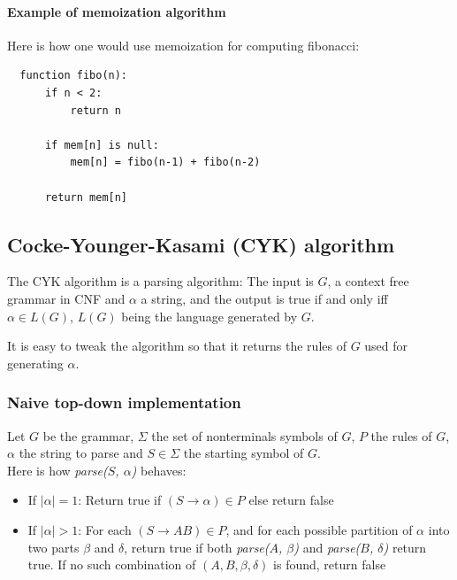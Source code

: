 \documentclass[twocolumn]{article}
\begin{document}
\paragraph{Example of memoization algorithm} Here is how one would use memoization for computing fibonacci:\\
\begin{lstlisting}
  function fibo(n):
      if n < 2:
          return n

      if mem[n] is null:
          mem[n] = fibo(n-1) + fibo(n-2)
          
      return mem[n]
\end{lstlisting}

\subsection{Cocke-Younger-Kasami (CYK) algorithm}
The CYK algorithm is a parsing algorithm: The input is $G$, a context free grammar in CNF and $\alpha$ a string, and the output is true if and only iff $\alpha\in L(G)$, $L(G)$ being the language generated by $G$.\par
It is easy to tweak the algorithm so that it returns the rules of $G$ used for generating $\alpha$.

\subsubsection{Naive top-down implementation}
Let $G$ be the grammar, $\Sigma$ the set of nonterminals symbols of $G$, $P$ the rules of $G$, $\alpha$ the string to parse and $S\in \Sigma$ the starting symbol of $G$.\\
Here is how \textit{parse($S$, $\alpha$)} behaves:
\begin{itemize}
\item If $|\alpha|=1$: Return true if $(S\rightarrow\alpha)\in P$ else return false
\item If $|\alpha|>1$: For each $(S\rightarrow AB)\in P$, and for each possible partition of $\alpha$ into two parts $\beta$ and $\delta$, return true if
both \textit{parse($A$, $\beta$)} and \textit{parse($B$, $\delta$)} return true. If no such combination of $(A,B,\beta,\delta)$ is found, return false
\end{itemize}
\end{document}
